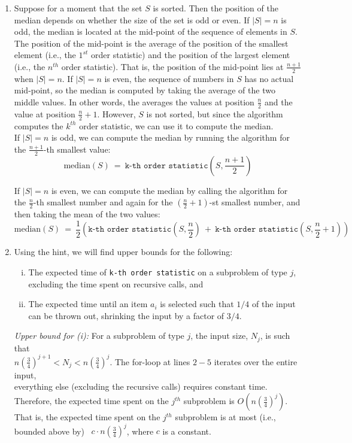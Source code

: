 \documentclass[twoside,11pt]{homework}
\begin{document}
\begin{enumerate}[\bf (a)]

\item  Suppose for a moment that the set $S$ is sorted.  Then the position of the median depends on whether the size of the set is odd or even. If $|S| = n$ is odd, the median is located at the mid-point of the sequence of elements in $S$. The position of the mid-point is the average of the position of the smallest element (i.e., the $1^{st}$ order statistic) and the position of the largest element (i.e., the $n^{th}$ order statistic).  That is, the position of the mid-point lies at $\frac{n+1}{2}$ when $|S| = n$.   If $|S| = n$ is even, the sequence of numbers in $S$ has no actual mid-point, so the median is computed by taking the average of the two middle values. In other words, the averages the values at position $\frac{n}{2}$ and the value at position $\frac{n}{2} +1$.   However, $S$ is not sorted, but since the algorithm computes the $k^{th}$ order statistic, we can use it to compute the median.  \\

If $|S| = n$ is odd, we can compute the median by running the algorithm for the $\frac{n+1}{2}$-th smallest value: 
$$\textrm{median}(S) \ = \ \texttt{k-th order statistic}\left(S, \frac{n+1}{2}\right)$$

If $|S| = n$ is even, we can compute the median by calling the algorithm for the $\frac{n}{2}$-th smallest number and again for the $\left(\frac{n}{2} + 1\right)$-st smallest number, and then taking the mean of the two values:
$$\textrm{median}(S) \ = \  \frac{1}{2}\left(  \texttt{k-th order statistic}\left(S, \frac{n}{2}\right)  \ + \ \texttt{k-th order statistic}\left(S, \frac{n}{2} + 1 \right)  \right)$$

\item Using the hint, we will find upper bounds for the following:

\begin{enumerate}[(i)]
\item The expected time of \texttt{k-th order statistic} on a subproblem of type $j$, excluding the time spent on recursive calls, and 
\item The expected time until an item $a_i$ is selected such that $1/4$ of the input can be thrown out, shrinking the input by a factor of $3/4$.
\end{enumerate}

\textit{Upper bound for (i):}
For a subproblem of type $j$, the input size,  $N_j$,  is such that \\[0.3em]
$n\left(\frac{3}{4}\right)^{j+1} < N_j < n\left(\frac{3}{4}\right)^j$.  The for-loop at lines $2-5$ iterates over the entire input,  \\[0.3em]
everything else (excluding the recursive calls) requires constant time.  Therefore,  the expected time spent on the $j^{th}$ subproblem is $O\left(n\left(\frac{3}{4}\right)^j\right)$.  That is,  the expected time spent on the $j^{th}$ subproblem is at most (i.e., bounded above by) \ $c \cdot n\left(\frac{3}{4}\right)^j$, where $c$ is a constant. \\


\end{enumerate}
\end{document}
